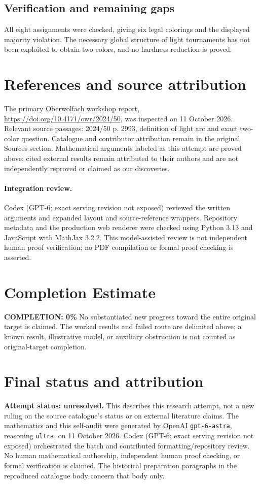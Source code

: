 \documentclass[11pt]{article}
\begin{document}
\subsection{Verification and remaining gaps}
All eight assignments were checked, giving six legal colorings and the displayed majority violation. The necessary global structure of light tournaments has not been exploited to obtain two colors, and no hardness reduction is proved.

\section{References and source attribution}
The primary Oberwolfach workshop report, \url{https://doi.org/10.4171/owr/2024/50}, was inspected on 11 October 2026. Relevant source passages: 2024/50 p. 2993, definition of light arc and exact two-color question. Catalogue and contributor attribution remain in the original Sources section. Mathematical arguments labeled as this attempt are proved above; cited external results remain attributed to their authors and are not independently reproved or claimed as our discoveries.


\paragraph{Integration review.} Codex (GPT-6; exact serving revision not exposed) reviewed the written arguments and expanded layout and source-reference wrappers. Repository metadata and the production web renderer were checked using Python 3.13 and JavaScript with MathJax 3.2.2. This model-assisted review is not independent human proof verification; no PDF compilation or formal proof checking is asserted.

\section{Completion Estimate}
\noindent\textbf{COMPLETION: 0\%}
No substantiated new progress toward the entire original target is claimed. The worked results and failed route are delimited above; a known result, illustrative model, or auxiliary obstruction is not counted as original-target completion.

\section{Final status and attribution}
\textbf{Attempt status: unresolved.} This describes this research attempt, not a new ruling on the source catalogue's status or on external literature claims.
The mathematics and this self-audit were generated by OpenAI \texttt{gpt-6-astra}, reasoning \texttt{ultra}, on 11 October 2026. Codex (GPT-6; exact serving revision not exposed) orchestrated the batch and contributed formatting/repository review. No human mathematical authorship, independent human proof checking, or formal verification is claimed. The historical preparation paragraphs in the reproduced catalogue body concern that body only.
\end{document}
